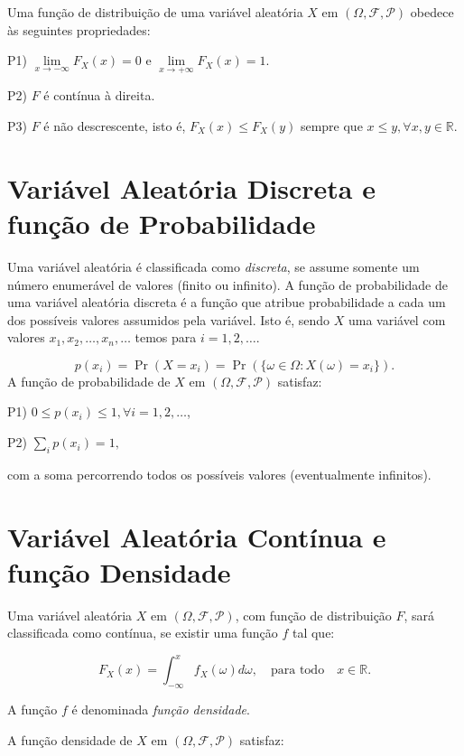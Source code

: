 \documentclass[
  letterpaper,
  DIV=11,
  numbers=noendperiod]{scrreprt}
\begin{document}
Uma função de distribuição de uma variável aleatória \(X\) em
\((\Omega, \mathcal{F}, \mathcal{P})\) obedece às seguintes
propriedades:

P1) \(\lim \limits_{x \to -\infty} F_X(x) = 0\) e
\(\lim \limits_{x \to +\infty}F_X(x) = 1\).

P2) \(F\) é contínua à direita.

P3) \(F\) é não descrescente, isto é, \(F_X(x) \leq F_X(y)\) sempre que
\(x \leq y, \forall x,y \in \mathbb{R}\).

\section{Variável Aleatória Discreta e função de
Probabilidade}\label{variuxe1vel-aleatuxf3ria-discreta-e-funuxe7uxe3o-de-probabilidade}

Uma variável aleatória é classificada como \emph{discreta}, se assume
somente um número enumerável de valores (finito ou infinito). A função
de probabilidade de uma variável aleatória discreta é a função que
atribue probabilidade a cada um dos possíveis valores assumidos pela
variável. Isto é, sendo \(X\) uma variável com valores
\(x_1, x_2, \dots, x_n, \dots\) temos para \(i = 1, 2, \dots\).

\[p(x_i) = \Pr(X = x_i) = \Pr(\{\omega \in \Omega: X(\omega) = x_i\}).\]
A função de probabilidade de \(X\) em
\((\Omega, \mathcal{F}, \mathcal{P})\) satisfaz:

P1) \(0 \leq p(x_i) \leq 1, \forall i = 1, 2, \dots\),

P2) \(\sum \limits_{i} p(x_i) = 1,\)

com a soma percorrendo todos os possíveis valores (eventualmente
infinitos).

\section{Variável Aleatória Contínua e função
Densidade}\label{variuxe1vel-aleatuxf3ria-contuxednua-e-funuxe7uxe3o-densidade}

Uma variável aleatória \(X\) em \((\Omega, \mathcal{F}, \mathcal{P})\),
com função de distribuição \(F\), sará classificada como contínua, se
existir uma função \(f\) tal que:

\[F_X(x) = \int_{-\infty}^x f_X(\omega) d\omega, \quad\text{para todo} \quad x \in \mathbb{R}.\]

A função \(f\) é denominada \emph{função densidade}.

A função densidade de \(X\) em \((\Omega, \mathcal{F}, \mathcal{P})\)
satisfaz:
\end{document}

